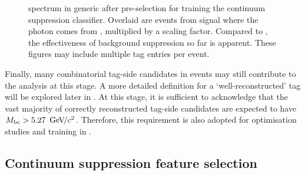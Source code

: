 \begin{figure}[htbp!]
    \centering
    \caption{\label{fig:preselected_photons} \BtoXsgamma spectrum in generic \MC after pre-selection for training the continuum suppression \BDT classifier.
    Overlaid are events from signal \MC where the photon comes from \BtoXsgamma, multiplied by a scaling factor.
    Compared to , the effectiveness of background suppression so far is apparent.
    These figures may include multiple tag entries per event.
    }
\end{figure}

Finally, many combinatorial tag-side candidates in \BB events may still contribute to the analysis at this stage.
A more detailed definition for a `well-reconstructed' tag will be explored later in .
At this stage, it is sufficient to acknowledge that the vast majority of correctly reconstructed tag-side candidates are expected to have ${M_{\mathrm{bc}}}>5.27~{\mathrm{\,Ge\kern -0.1em V\!/}c^2}$.
Therefore, this requirement is also adopted for optimisation studies and training in .

\subsection{Continuum suppression feature selection}\label{sec:continuum_features}

